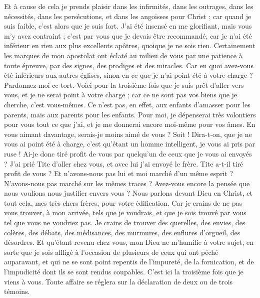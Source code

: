 \begin{multicols}{2}
Et à cause de cela je prends plaisir dans les infirmités, dans les outrages, dans les nécessités, dans les persécutions, et dans les angoisses pour Christ ; car quand je suis faible, c'est alors que je suis fort.
J'ai été insensé en me glorifiant, mais vous m'y avez contraint ; c’est par vous que je devais être recommandé, car je n'ai été inférieur en rien aux plus excellents apôtres, quoique je ne sois rien.
Certainement les marques de mon apostolat ont éclaté au milieu de vous par une patience à toute épreuve, par des signes, des prodiges et des miracles.
Car en quoi avez-vous été inférieurs aux autres églises, sinon en ce que je n’ai point été à votre charge ? Pardonnez-moi ce tort.
Voici pour la troisième fois que je suis prêt d'aller vers vous, et je ne serai point à votre charge ; car ce ne sont pas vos biens que je cherche, c’est vous-mêmes. Ce n’est pas, en effet, aux enfants d’amasser pour les parents, mais aux parents pour les enfants.
Pour moi, je dépenserai très volontiers pour vous tout ce que j’ai, et je me donnerai encore moi-même pour vos âmes. En vous aimant davantage, serais-je moins aimé de vous ?
Soit ! Dira-t-on, que je ne vous ai point été à charge, c'est qu'étant un homme intelligent, je vous ai pris par ruse !
Ai-je donc tiré profit de vous par quelqu’un de ceux que je vous ai envoyés ?
J'ai prié Tite d'aller chez vous, et avec lui j’ai envoyé le frère. Tite a-t-il tiré profit de vous ? Et n'avons-nous pas lui et moi marché d'un même esprit ? N'avons-nous pas marché sur les mêmes traces ?
Avez-vous encore la pensée que nous voulions nous justifier envers vous ? Nous parlons devant Dieu en Christ, et tout cela, mes très chers frères, pour votre édification.
Car je crains de ne pas vous trouver, à mon arrivée, tels que je voudrais, et que je sois trouvé par vous tel que vous ne voudriez pas. Je crains de trouver des querelles, des envies, des colères, des débats, des médisances, des murmures, des enflures d'orgueil, des désordres.
Et qu'étant revenu chez vous, mon Dieu ne m'humilie à votre sujet, en sorte que je sois affligé à l'occasion de plusieurs de ceux qui ont péché auparavant, et qui ne se sont point repentis de l'impureté, de la fornication, et de l'impudicité dont ils se sont rendus coupables.
\VerseOne{}C'est ici la troisième fois que je viens à vous. Toute affaire se réglera sur la déclaration de deux ou de trois témoins.

\end{multicols}

